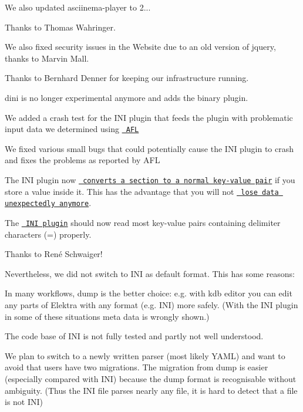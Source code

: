 We also updated asciinema-\/player to 2...

Thanks to Thomas Wahringer.

We also fixed security issues in the Website due to an old version of jquery, thanks to Marvin Mall.

Thanks to Bernhard Denner for keeping our infrastructure running.


\begin{DoxyItemize}
\item {\ttfamily dini} is no longer experimental anymore and adds the binary plugin.
\item We added a crash test for the I\+NI plugin that feeds the plugin with problematic input data we determined using \href{http://lcamtuf.coredump.cx/afl}{\texttt{ A\+FL}}
\item We fixed various small bugs that could potentially cause the I\+NI plugin to crash and fixes the problems as reported by A\+FL
\item The I\+NI plugin now \href{https://github.com/ElektraInitiative/libelektra/issues/1793}{\texttt{ converts a section to a normal key-\/value pair}} if you store a value inside it. This has the advantage that you will not \href{https://github.com/ElektraInitiative/libelektra/issues/1697}{\texttt{ lose data unexpectedly anymore}}.
\item The \href{https://www.libelektra.org/plugins/ini}{\texttt{ I\+NI plugin}} should now read most key-\/value pairs containing delimiter characters ({\ttfamily =}) properly.
\end{DoxyItemize}

Thanks to René Schwaiger!

Nevertheless, we did not switch to I\+NI as default format. This has some reasons\+:


\begin{DoxyItemize}
\item In many workflows, {\ttfamily dump} is the better choice\+: e.\+g. with {\ttfamily kdb editor} you can edit any parts of Elektra with any format (e.\+g. I\+NI) more safely. (With the I\+NI plugin in some of these situations meta data is wrongly shown.)
\item The code base of I\+NI is not fully tested and partly not well understood.
\item We plan to switch to a newly written parser (most likely Y\+A\+ML) and want to avoid that users have two migrations. The migration from {\ttfamily dump} is easier (especially compared with I\+NI) because the {\ttfamily dump} format is recognisable without ambiguity. (Thus the I\+NI file parses nearly any file, it is hard to detect that a file is not I\+NI)
\end{DoxyItemize}

